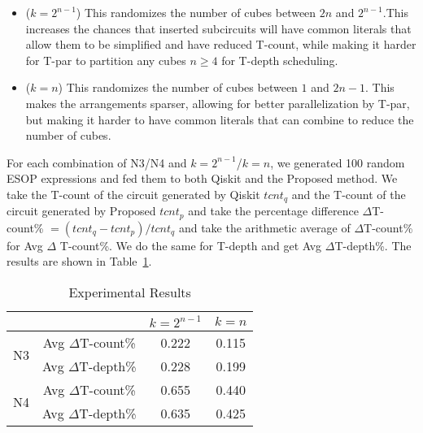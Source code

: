 \begin{itemize}
\item ($k=2^{n-1}$) This randomizes the number of cubes between $2n$ and $2^{n-1}$.This increases the chances
  that inserted subcircuits will have common literals that allow them to be simplified and have reduced T-count,
  while making it harder for T-par to partition any cubes $n \geq 4$ for T-depth scheduling.
\item ($k=n$) This randomizes the number of cubes between $1$ and $2n-1$. This makes the arrangements sparser,
  allowing for better parallelization by T-par, but making it harder to have common literals that can combine
  to reduce the number of cubes.
\end{itemize}

For each combination of N3/N4 and $k=2^{n-1}$/$k=n$, we generated 100 random ESOP expressions and fed them
to both Qiskit and the Proposed method. We take the T-count of the circuit generated by Qiskit $tcnt_q$ and
the T-count of the circuit generated by Proposed $tcnt_p$ and take the percentage difference
$\Delta$T-count\% $= (tcnt_q - tcnt_p) / tcnt_q$ and take the arithmetic average of $\Delta$T-count\% for
Avg $\Delta$ T-count\%. We do the same for T-depth and get Avg $\Delta$T-depth\%. The results are
shown in Table~\ref{table-results}.

\begin{table}[t]
  \begin{center}
    \scalebox{1.2} {
      \begin{tabular}{c|c|c|c}\hline
                            &                   & $k=2^{n-1}$ & $k=n$    \\\hline
        \multirow{2}{*}{N3} & Avg $\Delta$T-count\% &  0.222      & 0.115    \\\cline{2-4}
                            & Avg $\Delta$T-depth\% &  0.228      & 0.199    \\\hline
        \multirow{2}{*}{N4} & Avg $\Delta$T-count\% &  0.655      & 0.440    \\\cline{2-4}
                            & Avg $\Delta$T-depth\% &  0.635      & 0.425    \\\hline

      \end{tabular}        
    }
  \end{center}
  \caption{Experimental Results}
  \label{table-results}
  \vspace{-0.5cm}
\end{table}

